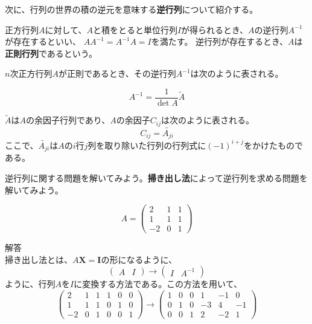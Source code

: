 \documentclass{jlreq}
\begin{document}
次に、行列の世界の積の逆元を意味する\textbf{逆行列}について紹介する。

\begin{definitionbox}[逆行列]
  正方行列$A$に対して、$A$と積をとると単位行列$I$が得られるとき、$A$の逆行列$A^{-1}$が存在するといい、
  $A A^{-1} = A^{-1} A = I$を満たす。 逆行列が存在するとき、$A$は\textbf{正則行列}であるという。
\end{definitionbox}

\begin{theorembox}[逆行列と余因子行列]
  $n$次正方行列$A$が正則であるとき、その逆行列$A^{-1}$は次のように表される。
  
  \begin{equation*}
    A^{-1} = \frac{1}{\det A} \tilde{A}
  \end{equation*}

  $\tilde{A}$は$A$の余因子行列であり、$A$の余因子$C_{ij}$は次のように表される。
  \begin{equation*}
    C_{ij} = \tilde{A_{ji}}
  \end{equation*}
  ここで、$\tilde{A_{ji}}$は$A$の$i$行$j$列を取り除いた行列の行列式に$(-1)^{i+j}$をかけたものである。
\end{theorembox}

逆行列に関する問題を解いてみよう。\textbf{掃き出し法}によって逆行列を求める問題を解いてみよう。

\begin{problem}
  \begin{equation*}
    A = \begin{pmatrix}
      2 & 1 & 1 \\
      1 & 1 & 1 \\
      -2 & 0 & 1
    \end{pmatrix}
  \end{equation*}
  \dotfill

  解答 \\
  掃き出し法とは、$A \boldsymbol{X} = \boldsymbol{I}$の形になるように、
  \begin{equation*}
    \begin{pmatrix}
      A & I
    \end{pmatrix} \to \begin{pmatrix}
      I & A^{-1}
    \end{pmatrix}
  \end{equation*}
  ように、行列$A$を$I$に変換する方法である。この方法を用いて、
  \begin{equation*}
    \begin{pmatrix}
      2 & 1 & 1 & 1 & 0 & 0 \\
      1 & 1 & 1 & 0 & 1 & 0 \\
      -2 & 0 & 1 & 0 & 0 & 1
    \end{pmatrix} \to \begin{pmatrix}
      1 & 0 & 0 & 1 & -1 & 0 \\
      0 & 1 & 0 & -3 & 4 & -1 \\
      0 & 0 & 1 & 2 & -2 & 1
    \end{pmatrix}
  \end{equation*}
\end{problem}
\end{document}
